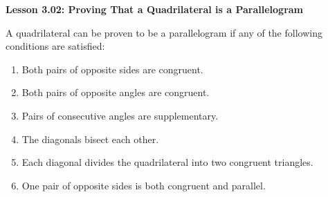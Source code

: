 \begin{center}
\textbf{Lesson 3.02: Proving That a Quadrilateral is a Parallelogram}
\end{center}

\vspace*{-1.5ex}

\noindent A quadrilateral can be proven to be a parallelogram if any of the following conditions are satisfied:
\begin{enumerate}[label=\color{blue}\arabic*.]
    \item Both pairs of opposite sides are congruent.
    \item Both pairs of opposite angles are congruent.
    \item Pairs of consecutive angles are supplementary.
    \item The diagonals bisect each other.
    \item Each diagonal divides the quadrilateral into two congruent triangles.
    \item One pair of opposite sides is both congruent and parallel.
\end{enumerate}
